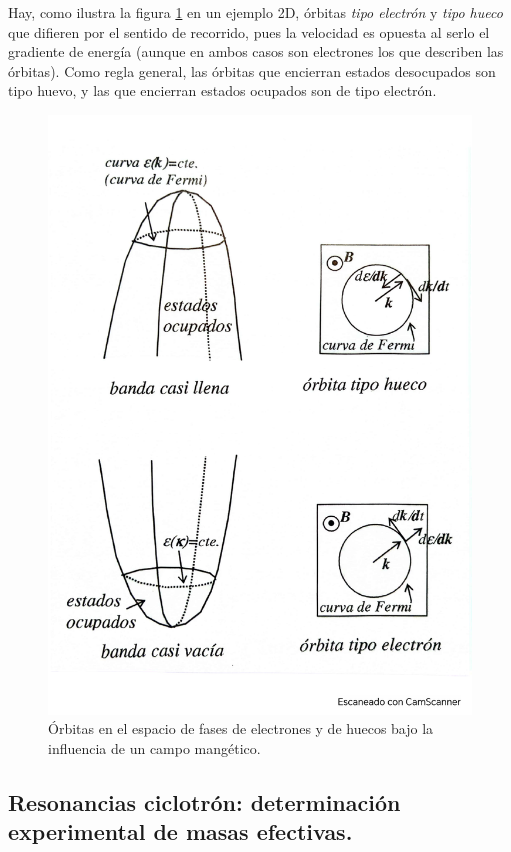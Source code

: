Hay, como ilustra la figura \ref{Fig:08-04} en un ejemplo 2D, órbitas \textit{tipo electrón} y \textit{tipo hueco} que difieren por el sentido de recorrido, pues la velocidad es opuesta al serlo el gradiente de energía (aunque en ambos casos son electrones los que describen las órbitas). Como regla general, las órbitas que encierran estados desocupados son tipo huevo, y las que encierran estados ocupados son de tipo electrón.

\begin{figure}[h!] \centering
	\includegraphics[scale=0.5]{Cuerpo/Ch_08/Fotos libro 4.pdf}
	\caption{Órbitas en el espacio de fases de electrones y de huecos bajo la influencia de un campo mangético.}
	\label{Fig:08-04}
\end{figure}

\subsection{Resonancias ciclotrón: determinación experimental de masas efectivas.}

